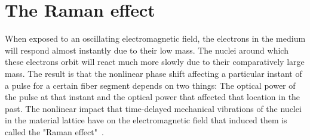 \chapter{The Raman effect}
\label{ch:Raman}

When exposed to an oscillating electromagnetic field, the electrons in the medium will respond almost instantly due to their low mass. The nuclei around which these electrons orbit will react much more slowly due to their comparatively large mass. The result is that the nonlinear phase shift affecting a particular instant of a pulse for a certain fiber segment depends on two things: The optical power of the pulse at that instant and the optical power that affected that location in the past. The nonlinear impact that time-delayed mechanical vibrations of the nuclei in the material lattice have on the electromagnetic field that induced them is called the "Raman effect"~\cite{Raman_original}.  



